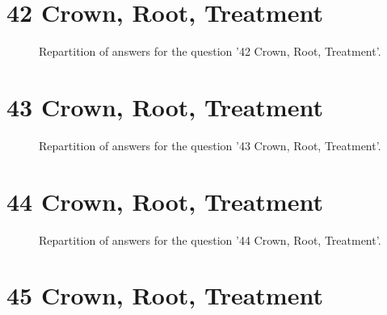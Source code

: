 \documentclass[12pt]{article}
\begin{document}
\clearpage{}
\section{42
Crown, Root, Treatment}

\label{sec:47}


\begin{figure}[h!]
    \caption{\label{figure:q47-1}Repartition of answers for the question '42
Crown, Root, Treatment'.}
\end{figure}



\clearpage{}
\section{43
Crown, Root, Treatment}

\label{sec:46}


\begin{figure}[h!]
    \caption{\label{figure:q46-1}Repartition of answers for the question '43
Crown, Root, Treatment'.}
\end{figure}



\clearpage{}
\section{44
Crown, Root, Treatment}

\label{sec:45}


\begin{figure}[h!]
    \caption{\label{figure:q45-1}Repartition of answers for the question '44
Crown, Root, Treatment'.}
\end{figure}



\clearpage{}
\section{45
Crown, Root, Treatment}
\end{document}
